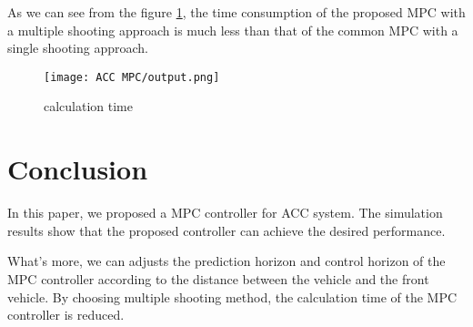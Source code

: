 \documentclass{article}
\numberwithin{equation}{section}
\begin{document}
As we can see from the figure \ref{fig:calculate_time}, the time consumption of
the proposed MPC with a multiple shooting approach is much less than that of
the common MPC with a single shooting approach.

\begin{figure}[h!]
    \centering
    \texttt{[image: ACC MPC/output.png]}
    \caption{calculation time}
    \label{fig:calculate_time}
\end{figure}

\section{Conclusion}

In this paper, we proposed a MPC controller for ACC system. The simulation
results show that the proposed controller can achieve the desired performance.

What's more, we can adjusts the prediction horizon and control horizon of the
MPC controller according to the distance between the vehicle and the front
vehicle. By choosing multiple shooting method, the calculation time of the MPC
controller is reduced.



\end{document}
